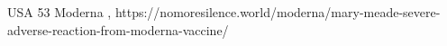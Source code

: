           {USA}
          {53}
          {Moderna}
          {}
          {
            ,
          }
          {https://nomoresilence.world/moderna/mary-meade-severe-adverse-reaction-from-moderna-vaccine/}



